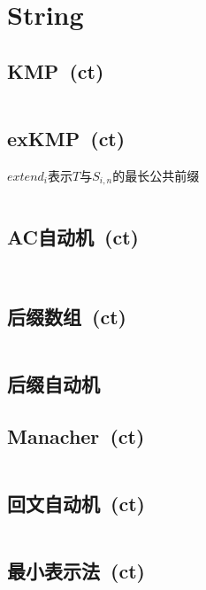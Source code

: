 \chapter{String}
\section{KMP\ \small(ct)}
	\inputminted{cpp}{String/kmp.cpp}
\section{exKMP\ \small(ct)}
	$ extend_i $表示$ T $与$ S_{i,n} $的最长公共前缀
	\inputminted{cpp}{String/ex_kmp.cpp}
\section{AC自动机\ \small(ct)}
	\inputminted{cpp}{String/suffix_automaton.cpp}
	\inputminted{cpp}{String/general_suffix_automaton.cpp}
\section{后缀数组\ \small(ct)}
	\inputminted{cpp}{String/suffix_array.cpp}
\section{后缀自动机}
\section{Manacher\ \small(ct)}
	\inputminted{cpp}{String/manacher.cpp}
\section{回文自动机\ \small(ct)}
	\inputminted{cpp}{String/palindromic_tree.cpp}
\section{最小表示法\ \small(ct)}
	\inputminted{cpp}{String/minimal_rounding_string.cpp}